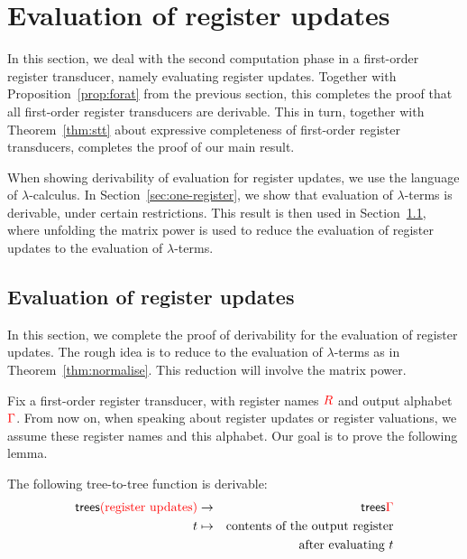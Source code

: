
\section{Evaluation of register updates}
\label{sec:stt-derivable}
In this section, we deal with the second computation phase in a first-order register transducer, namely evaluating register updates. Together with Proposition~\ref{prop:forat} from the previous section, this completes the proof that all first-order register transducers are derivable. This in turn, together with Theorem~\ref{thm:stt} about expressive completeness of first-order register transducers, completes the proof of our main result. 


When showing derivability of  evaluation for register updates, we  use the language of $\lambda$-calculus.  In Section~\ref{sec:one-register},  we show that evaluation of $\lambda$-terms is derivable, under certain restrictions. This result is then used in Section~\ref{sec:updates-endgame}, where unfolding the matrix power is used to reduce the evaluation of register updates to the evaluation of $\lambda$-terms.  


%

\subsection{Evaluation of register updates}
\label{sec:updates-endgame}
In this section, we complete the proof of derivability for the evaluation of register updates. The rough idea is to reduce to the evaluation of $\lambda$-terms as in Theorem~\ref{thm:normalise}. This reduction will involve the matrix power. 

Fix a first-order register transducer, with register names ${{\color{red}{R}}}$ and output alphabet ${\color{red}{\Gamma}}$.    From now on, when speaking about register updates or register valuations, we assume these register names and this alphabet. Our goal is to prove the following lemma. 
\begin{lemma}\label{lem:derive-register-updates}
    The  following tree-to-tree function  is derivable:
    \begin{eqnarray*}
    \mathsf {trees}{{\color{red}{\text{(register updates)}}}} &\to & \mathsf {trees} {\color{red}{\Gamma}} \\
    t & \mapsto & \text{contents of the output register}\\
    && \text{after evaluating $t$}
    \end{eqnarray*}    
\end{lemma}

